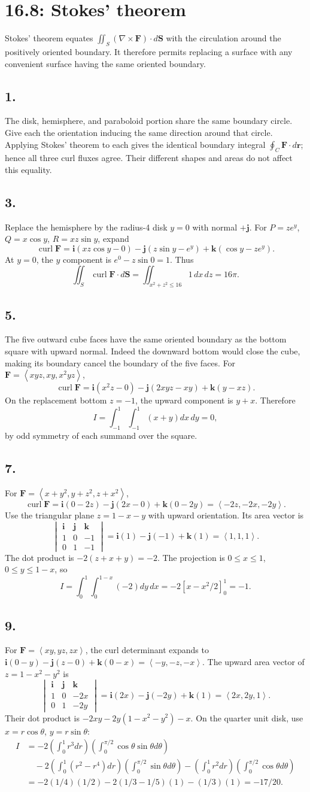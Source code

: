 \documentclass[11pt]{article}
\newcommand{\ex}[1]{\subsection*{#1.}}
\newcommand{\ans}[1]{\boxed{#1}}
\newcommand{\vv}[1]{\left\langle #1\right\rangle}
\newcommand{\ii}{\mathbf i}\newcommand{\jj}{\mathbf j}\newcommand{\kk}{\mathbf k}
\newcommand{\cp}[6]{\begin{vmatrix}\ii&\jj&\kk\\#1&#2&#3\\#4&#5&#6\end{vmatrix}}
\begin{document}
\clearpage\section*{16.8: Stokes' theorem}
Stokes' theorem equates $\iint_S(\nabla\times\mathbf F)\cdot d\mathbf S$ with the circulation around the positively oriented boundary. It therefore permits replacing a surface with any convenient surface having the same oriented boundary.
\ex{1}
The disk, hemisphere, and paraboloid portion share the same boundary circle. Give each the orientation inducing the same direction around that circle. Applying Stokes' theorem to each gives the identical boundary integral $\oint_C\mathbf F\cdot d\mathbf r$; hence all three curl fluxes agree. Their different shapes and areas do not affect this equality.
\ex{3}
Replace the hemisphere by the radius-4 disk $y=0$ with normal $+\jj$. For $P=ze^y$, $Q=x\cos y$, $R=xz\sin y$, expand
\[\operatorname{curl}\mathbf F=\ii(xz\cos y-0)-\jj(z\sin y-e^y)+\kk(\cos y-ze^y).\]
At $y=0$, the $y$ component is $e^0-z\sin0=1$. Thus
\[\iint_S\operatorname{curl}\mathbf F\cdot d\mathbf S
=\iint_{x^2+z^2\le16}1\,dx\,dz=\ans{16\pi}.\]
\ex{5}
The five outward cube faces have the same oriented boundary as the bottom square with upward normal. Indeed the downward bottom would close the cube, making its boundary cancel the boundary of the five faces. For $\mathbf F=\vv{xyz,xy,x^2yz}$,
\[\operatorname{curl}\mathbf F
=\ii(x^2z-0)-\jj(2xyz-xy)+\kk(y-xz).\]
On the replacement bottom $z=-1$, the upward component is $y+x$. Therefore
\[I=\int_{-1}^1\int_{-1}^1(x+y)dx\,dy=\ans{0},\]
by odd symmetry of each summand over the square.
\ex{7}
For $\mathbf F=\vv{x+y^2,y+z^2,z+x^2}$,
\[\operatorname{curl}\mathbf F=\ii(0-2z)-\jj(2x-0)+\kk(0-2y)=\vv{-2z,-2x,-2y}.\]
Use the triangular plane $z=1-x-y$ with upward orientation. Its area vector is
\[\cp{1}{0}{-1}{0}{1}{-1}=\ii(1)-\jj(-1)+\kk(1)=\vv{1,1,1}.\]
The dot product is $-2(z+x+y)=-2$. The projection is $0\le x\le1$, $0\le y\le1-x$, so
\[I=\int_0^1\int_0^{1-x}(-2)dy\,dx=-2[x-x^2/2]_0^1=\ans{-1}.\]
\ex{9}
For $\mathbf F=\vv{xy,yz,zx}$, the curl determinant expands to $\ii(0-y)-\jj(z-0)+\kk(0-x)=\vv{-y,-z,-x}$. The upward area vector of $z=1-x^2-y^2$ is
\[\cp{1}{0}{-2x}{0}{1}{-2y}=\ii(2x)-\jj(-2y)+\kk(1)=\vv{2x,2y,1}.\]
Their dot product is $-2xy-2y(1-x^2-y^2)-x$. On the quarter unit disk, use $x=r\cos\theta$, $y=r\sin\theta$:
\begin{align*}
I&=-2\left(\int_0^1r^3dr\right)\left(\int_0^{\pi/2}\cos\theta\sin\theta d\theta\right)\\
&\quad-2\left(\int_0^1(r^2-r^4)dr\right)\left(\int_0^{\pi/2}\sin\theta d\theta\right)
-\left(\int_0^1r^2dr\right)\left(\int_0^{\pi/2}\cos\theta d\theta\right)\\
&=-2(1/4)(1/2)-2(1/3-1/5)(1)-(1/3)(1)=\ans{-17/20}.
\end{align*}
\end{document}
